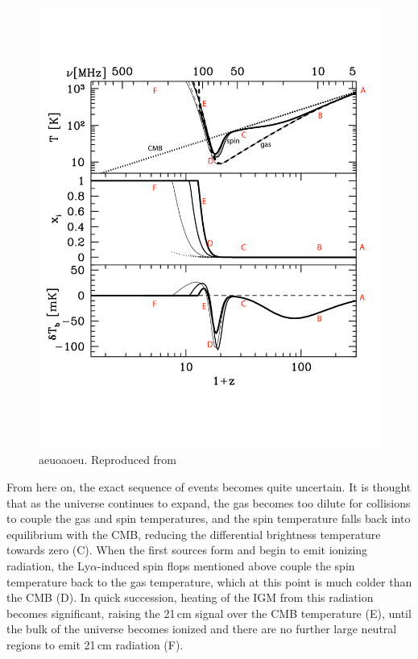 \begin{figure}
	\centering
	\includegraphics[width=7in]{chap0_intro/pritchard_and_loeb_temperatures_annotated.pdf}
	\caption[aoeuaoeu]{aeuoaoeu. Reproduced from \citet{PritchardLoebReview}}
	\label{fig:pritchardloebtemperatures}
\end{figure}

From here on, the exact sequence of events becomes quite uncertain. It is thought that as the universe continues to expand, the gas becomes too dilute for collisions to couple the gas and spin temperatures, and the spin temperature falls back into equilibrium with the CMB, reducing the differential brightness temperature towards zero (C). When the first sources form and begin to emit ionizing radiation, the Ly$\alpha$-induced spin flops mentioned above couple the spin temperature back to the gas temperature, which at this point is much colder than the CMB (D). In quick succession, heating of the IGM from this radiation becomes significant, raising the 21\,cm signal over the CMB temperature (E), until the bulk of the universe becomes ionized and there are no further large neutral regions to emit 21\,cm radiation (F).

